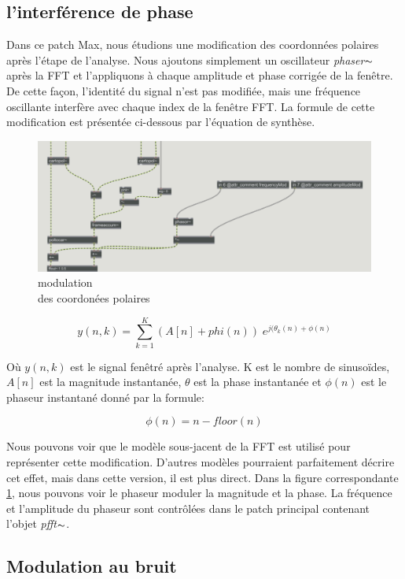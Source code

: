 \subsection{l'interférence de phase}
    Dans ce patch Max, nous étudions une modification des coordonnées polaires après l’étape de l’analyse. Nous ajoutons simplement un oscillateur \textit{phaser}$\thicksim$ après la FFT et l’appliquons à chaque amplitude et phase corrigée de la fenêtre. De cette façon, l'identité du signal n'est pas modifiée, mais une fréquence oscillante interfère avec chaque index de la fenêtre FFT. La formule de cette modification est présentée ci-dessous par l'équation de synthèse.

\begin{figure}
  \centering
  \includegraphics[width= 0.5 \textwidth]{Graphs/phasorInt.png}
  \caption{modulation \\ des coordonées polaires}
  \label{phasorInt}
\end{figure}

    \begin{equation}
      y(n, k) = \sum_{k=1}^K (A[n]+phi(n)) \; e^{j (\theta_k(n) +\phi(n)}
    \end{equation}
    
    Où $y (n, k)$ est le signal fenêtré après l'analyse. K est le nombre de sinusoïdes, $ A [n] $ est la magnitude instantanée, $ \theta $ est la phase instantanée et $ \phi (n) $ est le phaseur instantané donné par la formule:

    \begin{equation*}
        \phi(n) = n - floor(n)
    \end{equation*}

    Nous pouvons voir que le modèle sous-jacent de la FFT est utilisé pour représenter cette modification. D'autres modèles pourraient parfaitement décrire cet effet, mais dans cette version, il est plus direct. Dans la figure correspondante \ref{phasorInt}, nous pouvons voir le phaseur moduler la magnitude et la phase. La fréquence et l'amplitude du phaseur sont contrôlées dans le patch principal contenant l'objet \textit{pfft$\thicksim $}.

\subsection{Modulation au bruit}

